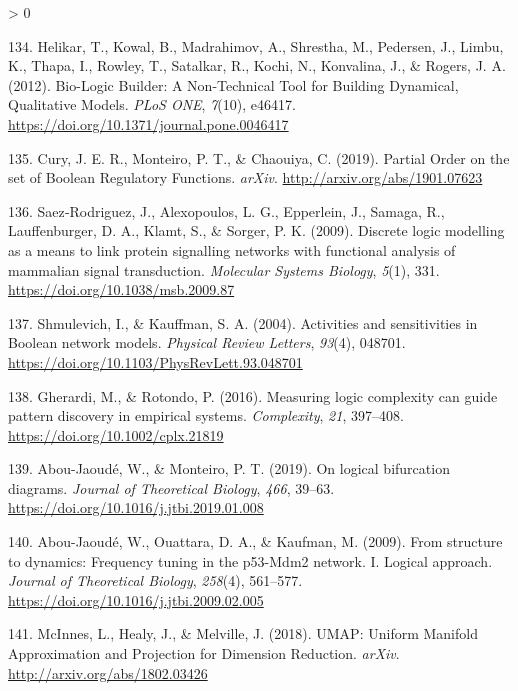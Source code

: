 \documentclass[
  12pt,
]{book}
\newlength{\cslhangindent}
\newenvironment{CSLReferences}[2] %
 {%
  \setlength{\parindent}{0pt}
  \ifodd #1 \everypar{\setlength{\hangindent}{\cslhangindent}}\ignorespaces\fi
  \ifnum #2 > 0
  \setlength{\parskip}{#2\baselineskip}
  \fi
 }%
 {}
\begin{document}
\begin{CSLReferences}{1}{0}
\leavevmode\hypertarget{ref-Helikar2012}{}%
134. Helikar, T., Kowal, B., Madrahimov, A., Shrestha, M., Pedersen, J., Limbu, K., Thapa, I., Rowley, T., Satalkar, R., Kochi, N., Konvalina, J., \& Rogers, J. A. (2012). {Bio-Logic Builder: A Non-Technical Tool for Building Dynamical, Qualitative Models}. \emph{PLoS ONE}, \emph{7}(10), e46417. \url{https://doi.org/10.1371/journal.pone.0046417}

\leavevmode\hypertarget{ref-Cury2019}{}%
135. Cury, J. E. R., Monteiro, P. T., \& Chaouiya, C. (2019). {Partial Order on the set of Boolean Regulatory Functions}. \emph{arXiv}. \url{http://arxiv.org/abs/1901.07623}

\leavevmode\hypertarget{ref-Saez-Rodriguez2009}{}%
136. Saez‐Rodriguez, J., Alexopoulos, L. G., Epperlein, J., Samaga, R., Lauffenburger, D. A., Klamt, S., \& Sorger, P. K. (2009). {Discrete logic modelling as a means to link protein signalling networks with functional analysis of mammalian signal transduction}. \emph{Molecular Systems Biology}, \emph{5}(1), 331. \url{https://doi.org/10.1038/msb.2009.87}

\leavevmode\hypertarget{ref-Shmulevich2004}{}%
137. Shmulevich, I., \& Kauffman, S. A. (2004). {Activities and sensitivities in Boolean network models}. \emph{Physical Review Letters}, \emph{93}(4), 048701. \url{https://doi.org/10.1103/PhysRevLett.93.048701}

\leavevmode\hypertarget{ref-Gherardi2016}{}%
138. Gherardi, M., \& Rotondo, P. (2016). {Measuring logic complexity can guide pattern discovery in empirical systems}. \emph{Complexity}, \emph{21}, 397--408. \url{https://doi.org/10.1002/cplx.21819}

\leavevmode\hypertarget{ref-Abou-Jaoude2019}{}%
139. Abou-Jaoudé, W., \& Monteiro, P. T. (2019). {On logical bifurcation diagrams}. \emph{Journal of Theoretical Biology}, \emph{466}, 39--63. \url{https://doi.org/10.1016/j.jtbi.2019.01.008}

\leavevmode\hypertarget{ref-Abou-Jaoude2009}{}%
140. Abou-Jaoudé, W., Ouattara, D. A., \& Kaufman, M. (2009). {From structure to dynamics: Frequency tuning in the p53-Mdm2 network. I. Logical approach}. \emph{Journal of Theoretical Biology}, \emph{258}(4), 561--577. \url{https://doi.org/10.1016/j.jtbi.2009.02.005}

\leavevmode\hypertarget{ref-McInnes2018}{}%
141. McInnes, L., Healy, J., \& Melville, J. (2018). {UMAP: Uniform Manifold Approximation and Projection for Dimension Reduction}. \emph{arXiv}. \url{http://arxiv.org/abs/1802.03426}


\end{CSLReferences}
\end{document}
